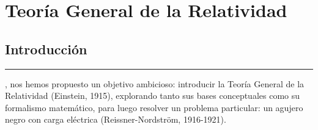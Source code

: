 \chapter{\textcolor{myred}{Teoría General de la Relatividad}}

\section{\huge{Introducción}}

\textcolor{myred}{\hrule}

, nos hemos propuesto un objetivo ambicioso: introducir la Teoría General de la Relatividad (Einstein, 1915), explorando tanto sus bases conceptuales como su formalismo matemático, para luego resolver un problema particular: un agujero negro con carga eléctrica (Reissner-Nordström, 1916-1921). 

